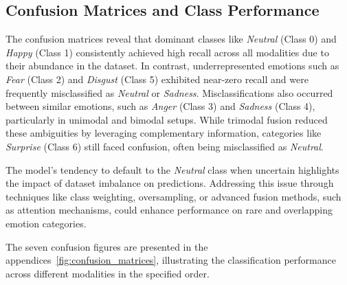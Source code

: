 \subsection{Confusion Matrices and Class Performance}
The confusion matrices reveal that dominant classes like \textit{Neutral} (Class 0) and \textit{Happy} (Class 1) consistently achieved high recall across all modalities due to their abundance in the dataset. In contrast, underrepresented emotions such as \textit{Fear} (Class 2) and \textit{Disgust} (Class 5) exhibited near-zero recall and were frequently misclassified as \textit{Neutral} or \textit{Sadness}. Misclassifications also occurred between similar emotions, such as \textit{Anger} (Class 3) and \textit{Sadness} (Class 4), particularly in unimodal and bimodal setups. While trimodal fusion reduced these ambiguities by leveraging complementary information, categories like \textit{Surprise} (Class 6) still faced confusion, often being misclassified as \textit{Neutral}.

The model's tendency to default to the \textit{Neutral} class when uncertain highlights the impact of dataset imbalance on predictions. Addressing this issue through techniques like class weighting, oversampling, or advanced fusion methods, such as attention mechanisms, could enhance performance on rare and overlapping emotion categories.

The seven confusion figures are presented in the appendices~\ref{fig:confusion_matrices}, illustrating the classification performance across different modalities in the specified order.

